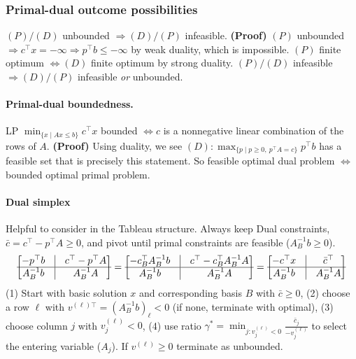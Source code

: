 \documentclass{article}
\begin{document}
\subsubsection{Primal-dual outcome possibilities} $(P) / (D)$ unbounded $\Rightarrow (D) / (P)$ infeasible. \textbf{(Proof)} $(P)$ unbounded $\Rightarrow c^\top x = -\infty \Rightarrow p^\top b \leq -\infty$ by weak duality, which is impossible. $(P)$ finite optimum $\iff (D)$ finite optimum by strong duality. $(P) / (D)$ infeasible $\Rightarrow (D) / (P)$ infeasible \textit{or} unbounded.

\paragraph{Primal-dual boundedness.} LP $\min_{\{x \mid Ax\leq b\}}c^\top x$ bounded $\iff c$ is a nonnegative linear combination of the rows of $A$. \textbf{(Proof)} Using duality, we see $(D): \max_{\{p \mid p \geq 0,\ p^\top A = c\}} p^\top b$ has a feasible set that is precisely this statement. So feasible optimal dual problem $\iff$ bounded optimal primal problem. 



\paragraph{Dual simplex}
Helpful to consider in the Tableau structure. Always keep Dual constraints, $\bar c = c^\top  - p^\top A \geq 0$, and pivot until primal constraints are feasible ($A_B^{-1}b \geq 0$). 
\begin{align*}
    \begin{bmatrix}
        -p^\top b & \vline& c^\top  - p^\top A\\
        \hline
        A_B^{-1}b & \vline & A_B^{-1}A
    \end{bmatrix} = 
    \begin{bmatrix}
        -c_B^\top A_B^{-1}b & \vline& c^\top  - c_B^\top A_B^{-1}A\\
        \hline
        A_B^{-1}b & \vline & A_B^{-1}A
    \end{bmatrix} = \begin{bmatrix}
        -c^\top x & \vline& \bar c^\top\\
        \hline
        A_B^{-1}b & \vline & A_B^{-1}A\\
    \end{bmatrix}
\end{align*}
(1) Start with basic solution $x$ and corresponding basis $B$ with $\bar c \geq 0$, 
(2) choose a row $\ell$ with $v^{(\ell)\top}=(A_B^{-1}b)_\ell < 0$ (if none, terminate with optimal),
(3) choose column $j$ with $v^{(\ell)}_j < 0$,
(4) use ratio $\gamma^* = \min_{j : v^{(\ell)}_j < 0} \frac{\bar c_j}{-v^{(\ell)}_j}$ to select the entering variable ($A_j$). If $v^{(\ell)}\geq 0$ terminate as unbounded.
\end{document}
